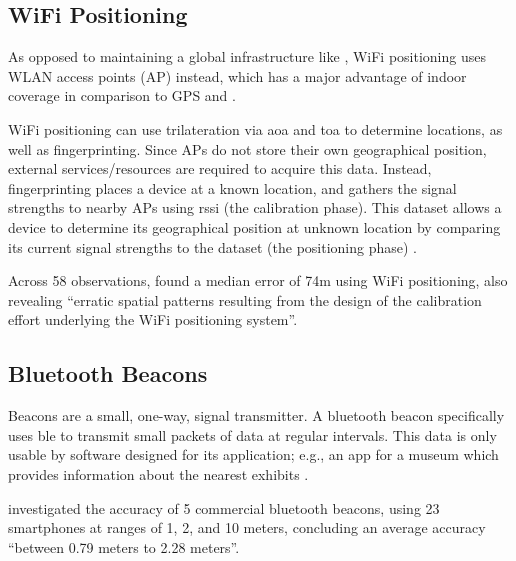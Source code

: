 \subsection{WiFi Positioning}

As opposed to maintaining a global infrastructure like
, WiFi positioning uses WLAN access
points (AP) instead, which has a major advantage of indoor
coverage in comparison to GPS and
\parencite{locationComparison}.

WiFi positioning can use \gls{trilateration} via \gls{aoa}
and \gls{toa} to determine locations, as well as
fingerprinting.
Since APs do not store their own geographical position,
external services/resources are required to acquire this
data.
Instead, fingerprinting places a device at a known
location, and gathers the signal strengths to nearby APs
using \gls{rssi} (the calibration phase).
This dataset allows a device to determine its geographical
position at unknown location by comparing its current
signal strengths to the dataset (the positioning phase)
\parencite{locationComparison}.

Across 58 observations, \cite{locationComparison} found a
median error of 74m using WiFi positioning, also revealing
\enquote{erratic spatial patterns resulting from the design
  of the calibration effort underlying the WiFi positioning
  system}.

\subsection{Bluetooth Beacons}

Beacons are a small, one-way, signal transmitter.
A bluetooth beacon specifically uses \gls{ble} to transmit
small packets of data at regular intervals.
This data is only usable by software designed for its
application; e.g., an app for a museum which provides
information about the nearest exhibits
\parencite{usingBluetoothBeacons}.

\cite{bluetoothBeaconAccuracy} investigated the accuracy of
5 commercial bluetooth beacons, using 23 smartphones at
ranges of 1, 2, and 10 meters, concluding an average
accuracy \enquote{between 0.79 meters to 2.28 meters}.
